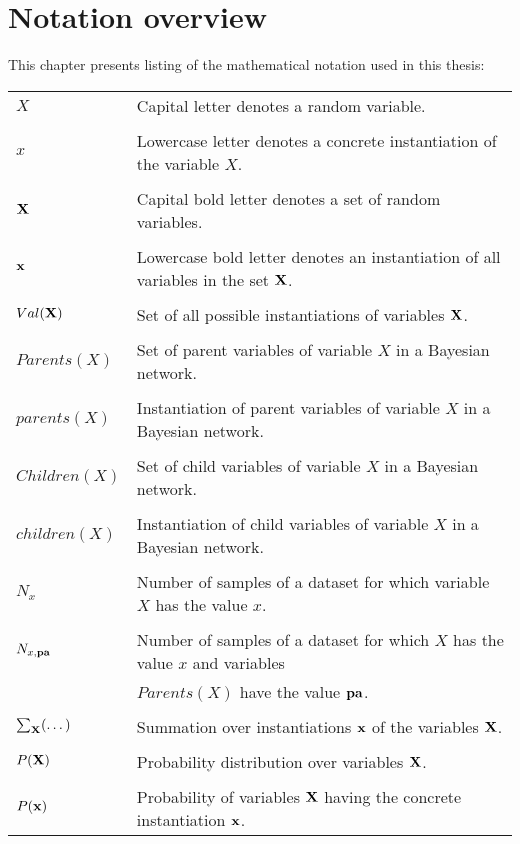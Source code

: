\chapter{Notation overview}
This chapter presents listing of the mathematical notation used in this thesis:

\bigskip
\begin{tabular}{ll}
	$X$ & Capital letter denotes a random variable.\\
	&\\
	$x$ & Lowercase letter denotes a concrete instantiation of the variable $X$.\\
	&\\
	${\bold{X}}$ & Capital bold letter denotes a set of random variables.\\
	&\\
	${\bold{x}}$ & Lowercase bold letter denotes an instantiation of all variables in the set ${\bold{X}}$.\\
	&\\
	$Val({\bold{X}})$ & Set of all possible instantiations of variables ${\bold{X}}$.\\
	&\\
	$Parents(X)$ & Set of parent variables of variable $X$ in a Bayesian network.\\
	&\\
	$parents(X)$ & Instantiation of parent variables of variable $X$ in a Bayesian network.\\
	&\\
	$Children(X)$ & Set of child variables of variable $X$ in a Bayesian network.\\
	&\\
	$children(X)$ & Instantiation of child variables of variable $X$ in a Bayesian network.\\
	&\\
	$N_x$ & Number of samples of a dataset for which variable $X$ has the value $x$.\\
	&\\
	$N_{x,{\bold{pa}}}$ & Number of samples of a dataset for which $X$ has the value $x$ and variables\\
	                  & $Parents(X)$ have the value ${\bold{pa}}$.\\
	&\\
	$\sum_{\bold{X}} (\dots)$ & Summation over instantiations ${\bold{x}}$ of the variables ${\bold{X}}$.\\
	&\\
	$P({\bold{X}})$ & Probability distribution over variables ${\bold{X}}$.\\
	&\\
	$P({\bold{x}})$ & Probability of variables ${\bold{X}}$ having the concrete instantiation ${\bold{x}}$.\\
\end{tabular}





